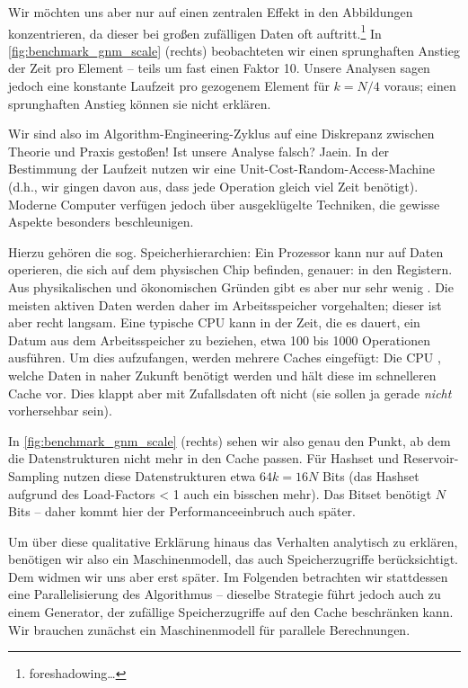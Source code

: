 Wir möchten uns aber nur auf einen zentralen Effekt in den Abbildungen konzentrieren, da dieser bei großen zufälligen Daten oft auftritt.\footnote{foreshadowing\ldots}
In \cref{fig:benchmark_gnm_scale} (rechts) beobachteten wir einen sprunghaften Anstieg der Zeit pro Element -- teils um fast einen Faktor 10.
Unsere Analysen sagen jedoch eine konstante Laufzeit pro gezogenem Element für $k = N/4$ voraus; einen sprunghaften Anstieg können sie nicht erklären.

Wir sind also im Algorithm-Engineering-Zyklus auf eine Diskrepanz zwischen Theorie und Praxis gestoßen!
Ist unsere Analyse falsch? Jaein.
In der Bestimmung der Laufzeit nutzen wir eine Unit-Cost-Random-Access-Machine (d.h., wir gingen davon aus, dass jede Operation gleich viel Zeit benötigt).
Moderne Computer verfügen jedoch über ausgeklügelte Techniken, die gewisse Aspekte besonders beschleunigen.

Hierzu gehören die sog. Speicherhierarchien: Ein Prozessor kann nur auf Daten operieren, die sich auf dem physischen Chip befinden, genauer: in den Registern.
Aus physikalischen und ökonomischen Gründen gibt es aber nur sehr wenig .
Die meisten aktiven Daten werden daher im Arbeitsspeicher vorgehalten; dieser ist aber recht langsam.
Eine typische CPU kann in der Zeit, die es dauert, ein Datum aus dem Arbeitsspeicher zu beziehen, etwa 100 bis 1000 Operationen ausführen.
Um dies aufzufangen, werden mehrere Caches eingefügt: Die CPU , welche Daten in naher Zukunft benötigt werden und hält diese im schnelleren Cache vor.
Dies klappt aber mit Zufallsdaten oft nicht (sie sollen ja gerade \emph{nicht} vorhersehbar sein).

In \cref{fig:benchmark_gnm_scale} (rechts) sehen wir also genau den Punkt, ab dem die Datenstrukturen nicht mehr in den Cache passen.
Für Hashset und Reservoir-Sampling nutzen diese Datenstrukturen etwa $64 k = 16 N$ Bits (das Hashset aufgrund des Load-Factors < 1 auch ein bisschen mehr).
Das Bitset benötigt $N$ Bits -- daher kommt hier der Performanceeinbruch auch später.

Um über diese qualitative Erklärung hinaus das Verhalten analytisch zu erklären, benötigen wir also ein Maschinenmodell, das auch Speicherzugriffe berücksichtigt.
Dem widmen wir uns aber erst später.
Im Folgenden betrachten wir stattdessen eine Parallelisierung des Algorithmus -- dieselbe Strategie führt jedoch auch zu einem Generator, der zufällige Speicherzugriffe auf den Cache beschränken kann.
Wir brauchen zunächst ein Maschinenmodell für parallele Berechnungen.

